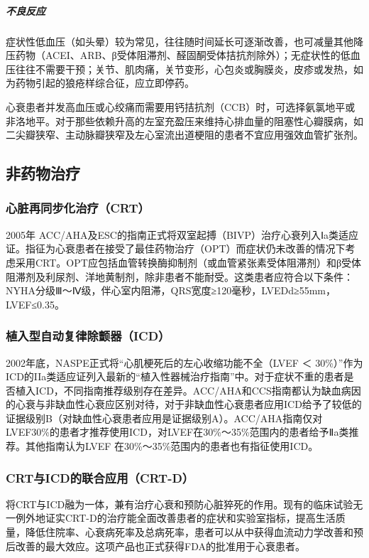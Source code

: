 \subparagraph{不良反应}

症状性低血压（如头晕）较为常见，往往随时间延长可逐渐改善，也可减量其他降压药物（ACEI、ARB、β受体阻滞剂、醛固酮受体拮抗剂除外）；无症状性的低血压往往不需要干预；关节、肌肉痛，关节变形，心包炎或胸膜炎，皮疹或发热，如为药物引起的狼疮样综合征，应立即停药。

心衰患者并发高血压或心绞痛而需要用钙拮抗剂（CCB）时，可选择氨氯地平或非洛地平。对于那些依赖升高的左室充盈压来维持心排血量的阻塞性心瓣膜病，如二尖瓣狭窄、主动脉瓣狭窄及左心室流出道梗阻的患者不宜应用强效血管扩张剂。

\subsection{非药物治疗}

\subsubsection{心脏再同步化治疗（CRT）}

2005年
ACC/AHA及ESC的指南正式将双室起搏（BIVP）治疗心衰列入Ⅰa类适应证。指征为心衰患者在接受了最佳药物治疗（OPT）而症状仍未改善的情况下考虑采用CRT。OPT应包括血管转换酶抑制剂（或血管紧张素受体阻滞剂）和β受体阻滞剂及利尿剂、洋地黄制剂，除非患者不能耐受。这类患者应符合以下条件：NYHA分级Ⅲ～Ⅳ级，伴心室内阻滞，QRS宽度≥120毫秒，LVEDd≥55mm，LVEF≤0.35。

\subsubsection{植入型自动复律除颤器（ICD）}

2002年底，NASPE正式将“心肌梗死后的左心收缩功能不全（LVEF ＜
30\%）”作为ICD的IIa类适应证列入最新的“植入性器械治疗指南”中。对于症状不重的患者是否植入ICD，不同指南推荐级别存在差异。ACC/AHA和CCS指南都认为缺血病因的心衰与非缺血性心衰应区别对待，对于非缺血性心衰患者应用ICD给予了较低的证据级别B（对缺血性心衰患者应用是证据级别A）。ACC/AHA指南仅对LVEF30\%的患者才推荐使用ICD，对LVEF在30\%～35\%范围内的患者给予Ⅱa类推荐。其他指南认为LVEF
在30\%～35\%范围内的患者也有指征使用ICD。

\subsubsection{CRT与ICD的联合应用（CRT-D）}

将CRT与ICD融为一体，兼有治疗心衰和预防心脏猝死的作用。现有的临床试验无一例外地证实CRT-D的治疗能全面改善患者的症状和实验室指标，提高生活质量，降低住院率、心衰病死率及总病死率，患者可以从中获得血流动力学改善和预后改善的最大效应。这项产品也正式获得FDA的批准用于心衰患者。

